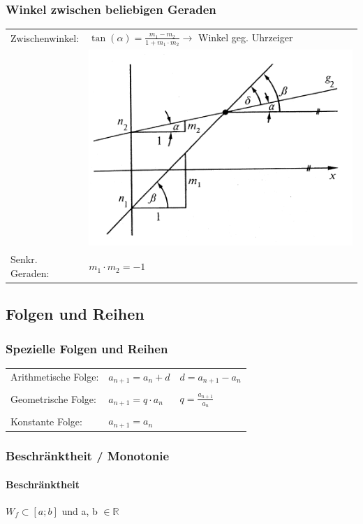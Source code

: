			
			\subsubsection{Winkel zwischen beliebigen Geraden}
			\begin{tabular}{ll}
			Zwischenwinkel: & $\tan(\alpha) = \frac{m_1 - m_2}{1 + m_1 \cdot m_2} \rightarrow$ Winkel geg. Uhrzeiger \\
			& \includegraphics[width=0.3\linewidth]{Bilder/zwischenwinkel.png}\\
			Senkr. Geraden: & $m_1 \cdot m_2 = -1$ \\
			\end{tabular}
            
		
		
		
		\subsection{Folgen und Reihen}			
			
			\subsubsection{Spezielle Folgen und Reihen}
			\begin{tabular}{lll}
			Arithmetische Folge: & $a_{n+1} = a_n + d$ & $d = a_{n+1} - a_n$ \\
			\\
			Geometrische Folge: & $a_{n+1} = q \cdot a_n $ & $q = \frac{a_{n+1}}{a_n}$ \\
			\\
			Konstante Folge: & $a_{n+1} = a_n$  & \\
			\end{tabular}				
			
			
			\subsubsection{Beschränktheit / Monotonie}
			\paragraph{Beschränktheit}
			$W_f \subset [a ; b]$ und a, b $\in \mathbb{R}$		
			
